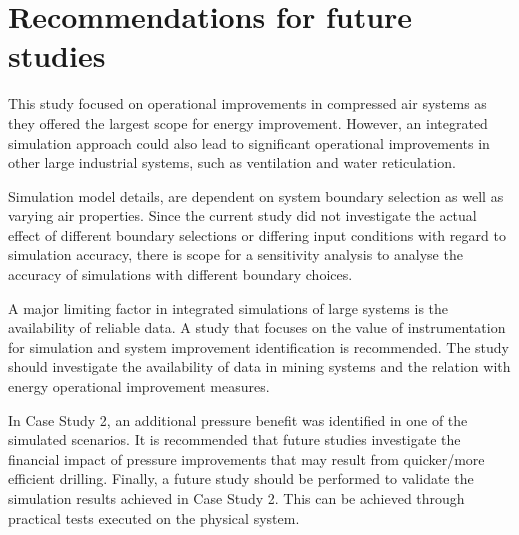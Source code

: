 	 \section{Recommendations for future studies}
	 This study focused on operational improvements in compressed air systems as they offered the largest scope for energy improvement. However, an integrated simulation approach could also lead to significant operational improvements in other large industrial systems, such as ventilation and water reticulation.
	 \par
	 \clearpage
	 Simulation model details, are dependent on system boundary selection as well as varying air properties. Since the current study did not investigate the actual effect of different boundary selections or differing input conditions with regard to simulation accuracy, there is scope for a sensitivity analysis to analyse the accuracy of simulations with different boundary choices.
	 \par
	 A major limiting factor in integrated simulations of large systems is the availability of reliable data. A study that focuses on the value of instrumentation for simulation and system improvement identification is recommended. The study should investigate the availability of data in mining systems and the  relation with energy operational improvement measures.
	 \par 
	 In Case Study 2, an additional pressure benefit was identified in one of the simulated scenarios. It is recommended that future studies investigate the financial impact of pressure improvements that may result from quicker/more efficient drilling. Finally, a future study should be performed to validate the simulation results achieved in Case Study 2. This can be achieved through practical tests executed on the physical system.

